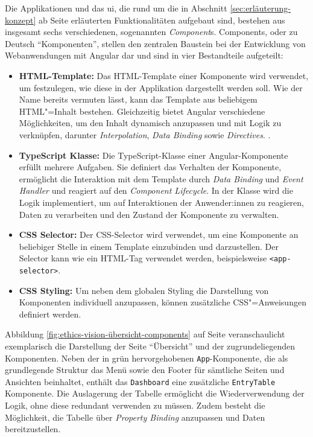\documentclass[a4paper,12pt,twoside]{scrreprt}
\begin{document}
Die Applikationen und das \acl{ui}, die rund um die in Abschnitt \ref{sec:erläuterung-konzept} ab Seite \pageref{sec:erläuterung-konzept} erläuterten Funktionalitäten aufgebaut sind, bestehen aus insgesamt sechs verschiedenen, sogenannten \textit{Component}s. Components, oder zu Deutsch \enquote{Komponenten}, stellen den zentralen Baustein bei der Entwicklung von Webanwendungen mit Angular dar und sind in vier Bestandteile aufgeteilt:
\begin{itemize}
    \item \textbf{HTML-Template:} Das HTML-Template einer Komponente wird verwendet, um festzulegen, wie diese in der Applikation dargestellt werden soll. Wie der Name bereits vermuten lässt, kann das Template aus beliebigem HTML"=Inhalt bestehen. Gleichzeitig bietet Angular verschiedene Möglichkeiten, um den Inhalt dynamisch anzupassen und mit Logik zu verknüpfen, darunter \textit{Interpolation}, \textit{Data Binding} sowie \textit{Directives}. \cite{google_llc_2023_angular-components, google_llc_2023_angular-template}.
    \item \textbf{TypeScript Klasse:} Die TypeScript-Klasse einer Angular-Komponente erfüllt mehrere Aufgaben. Sie definiert das Verhalten der Komponente, ermöglicht die Interaktion mit dem Template durch \textit{Data Binding} und \textit{Event Handler} und reagiert auf den \textit{Component Lifecycle}. In der Klasse wird die Logik implementiert, um auf Interaktionen der Anwender:innen zu reagieren, Daten zu verarbeiten und den Zustand der Komponente zu verwalten. \cite{google_llc_2023_angular-components, google_llc_2023-component-lifecycle}
    \item \textbf{CSS Selector:} Der CSS-Selector wird verwendet, um eine Komponente an beliebiger Stelle in einem Template einzubinden und darzustellen. Der Selector kann wie ein HTML-Tag verwendet werden, beispielsweise \texttt{<app-selector>}. \cite{google_llc_2023_angular-components}
    \item \textbf{CSS Styling:} Um neben dem globalen Styling die Darstellung von Komponenten individuell anzupassen, können zusätzliche CSS"=Anweisungen definiert werden. \cite{google_llc_2023_angular-components}
\end{itemize}

Abbildung \ref{fig:ethics-vision-übersicht-components} auf Seite \pageref{fig:ethics-vision-übersicht-components} veranschaulicht exemplarisch die Darstellung der Seite \enquote{Übersicht} und der zugrundeliegenden Komponenten. Neben der in grün hervorgehobenen \texttt{App}-Komponente, die als grundlegende Struktur das Menü sowie den Footer für sämtliche Seiten und Ansichten beinhaltet, enthält das \texttt{Dashboard} eine zusätzliche \texttt{EntryTable} Komponente. Die Auslagerung der Tabelle ermöglicht die Wiederverwendung der Logik, ohne diese redundant verwenden zu müssen. Zudem besteht die Möglichkeit, die Tabelle über \textit{Property Binding} anzupassen und Daten bereitzustellen.
\end{document}
